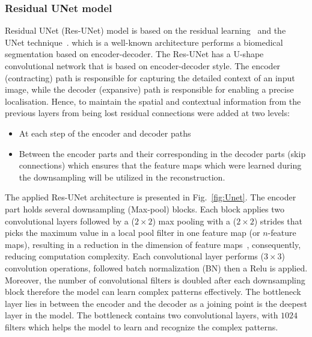 \subsubsection{Residual UNet model}
Residual UNet (Res-UNet) model is based on the residual learning~\cite{He2016} and the UNet technique~\cite{Ronneberger2015}. 
which is a well-known architecture performs a biomedical segmentation based on encoder-decoder. 
The Res-UNet has a U-shape convolutional network that is based on encoder-decoder style. 
The encoder (contracting) path is responsible for capturing the detailed context of an input image, while the decoder (expansive) path is responsible for enabling a precise localisation. 
Hence, to maintain the spatial and contextual information from the previous layers from being lost residual connections were added at two levels:
\begin{itemize}
	\item At each step of the encoder and decoder paths
	\item Between the encoder parts and their corresponding in the decoder parts (skip connections) which ensures that the feature maps which were learned during the downsampling will be utilized in the reconstruction. 
\end{itemize}
The applied Res-UNet architecture is presented in Fig.~\ref{fig:Unet}.
The encoder part holds several downsampling (Max-pool) blocks. 
Each block applies two convolutional layers followed by a (\(2\times2\)) max pooling with a (\(2\times2\)) strides that picks the maximum value in a local pool filter in one feature map (or \(n\)-feature maps), resulting in a reduction in the dimension of feature maps~\cite{Lecun2015}, consequently, reducing computation complexity.
Each convolutional layer performs (\(3\times3\)) convolution operations, followed batch normalization (BN) then a Relu is applied.
Moreover, the number of convolutional filters is doubled after each downsampling block therefore the model can learn complex patterns effectively. 
The bottleneck layer lies in between the encoder and the decoder as a joining point is the deepest layer in the model.
The bottleneck contains two convolutional layers, with \(1024\) filters which helps the model to learn and recognize the complex patterns.
